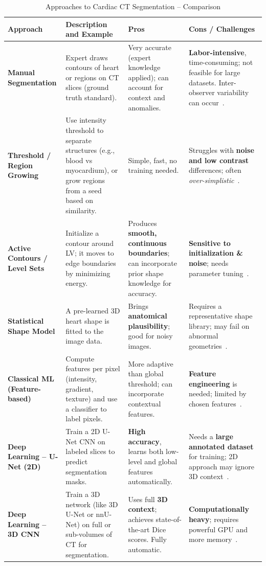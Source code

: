 \documentclass[12pt, BSc]{muthesis}
\begin{document}
\begin{table}[H]
\centering
\caption{Approaches to Cardiac CT Segmentation – Comparison}
\label{tab:segmentation_comparison}
\begin{tabular}{|p{3.5cm}|p{4.5cm}|p{3.5cm}|p{3.5cm}|}
\hline
\textbf{Approach} & \textbf{Description and Example} & \textbf{Pros} & \textbf{Cons / Challenges} \\ \hline
\textbf{Manual Segmentation} & Expert draws contours of heart or regions on CT slices (ground truth standard). & Very accurate (expert knowledge applied); can account for context and anomalies. & \textbf{Labor-intensive}, time-consuming; not feasible for large datasets. Inter-observer variability can occur~\cite{zhuang2013challenges, cardiacatlas2016manual}. \\ \hline
\textbf{Threshold / Region Growing} & Use intensity threshold to separate structures (e.g., blood vs myocardium), or grow regions from a seed based on similarity. & Simple, fast, no training needed. & Struggles with \textbf{noise and low contrast} differences; often \textit{over-simplistic}~\cite{kazemifar2014automated, Juergens2008Automated}. \\ \hline
\textbf{Active Contours / Level Sets} & Initialize a contour around LV; it moves to edge boundaries by minimizing energy. & Produces \textbf{smooth, continuous boundaries}; can incorporate prior shape knowledge for accuracy. & \textbf{Sensitive to initialization \& noise}; needs parameter tuning~\cite{barba2013comparative, Chen2024Automatic}. \\ \hline
\textbf{Statistical Shape Model} & A pre-learned 3D heart shape is fitted to the image data. & Brings \textbf{anatomical plausibility}; good for noisy images. & Requires a representative shape library; may fail on abnormal geometries~\cite{COOTES199538, ordas2007statistical}. \\ \hline
\textbf{Classical ML (Feature-based)} & Compute features per pixel (intensity, gradient, texture) and use a classifier to label pixels. & More adaptive than global threshold; can incorporate contextual features. & \textbf{Feature engineering} is needed; limited by chosen features~\cite{lei2021mri, Criminisi2011DecisionFF}. \\ \hline
\textbf{Deep Learning – U-Net (2D)} & Train a 2D U-Net CNN on labeled slices to predict segmentation masks. & \textbf{High accuracy}, learns both low-level and global features automatically. & Needs a \textbf{large annotated dataset} for training; 2D approach may ignore 3D context~\cite{ronneberger2015unet, Chen2020Deep}. \\ \hline
\textbf{Deep Learning – 3D CNN} & Train a 3D network (like 3D U-Net or nnU-Net) on full or sub-volumes of CT for segmentation. & Uses full \textbf{3D context}; achieves state-of-the-art Dice scores. Fully automatic. & \textbf{Computationally heavy}; requires powerful GPU and more memory~\cite{isensee2021nnunet, wasserthal2023totalsegmentator}. \\ \hline
\end{tabular}
\end{table}
\end{document}
